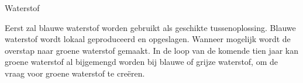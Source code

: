 \begin{voorstel}{Waterstof}
\begin{multicols*}{2}
\begin{aanbevelingen}
 Eerst zal blauwe waterstof worden gebruikt als geschikte tussenoplossing. Blauwe waterstof wordt lokaal geproduceerd en opgeslagen. Wanneer mogelijk wordt de overstap naar groene waterstof gemaakt. In de loop van de komende tien jaar kan groene waterstof al bijgemengd worden bij blauwe of grijze waterstof, om de vraag voor groene waterstof te creëren.


\end{aanbevelingen}

\end{multicols*}

\end{voorstel}
